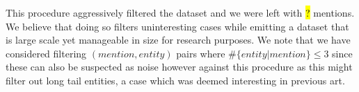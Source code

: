 \documentclass[11pt]{article}
\begin{document}
This procedure aggressively filtered the dataset and we were left with \hl{?} mentions. We believe that doing so filters uninteresting cases while emitting a dataset that is large scale yet manageable in size for research purposes. We note that we have considered filtering $(mention,entity)$ pairs where $\#\{entity|mention\}\le 3$ since these can also be suspected as noise however against this procedure as this might filter out long tail entities, a case which was deemed interesting in previous art.



\end{document}
